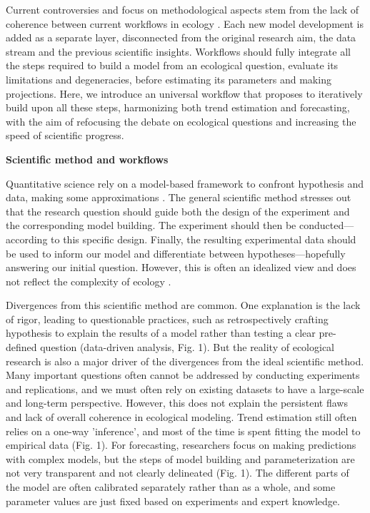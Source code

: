 \documentclass[11pt]{article}
\begin{document}
Current controversies and focus on methodological aspects stem from the lack of coherence between current workflows in ecology \citep{Loreau2022, Talis2023, Johnson2024}. Each new model development is added as a separate layer, disconnected from the original research aim, the data stream and the previous scientific insights. Workflows should fully integrate all the steps required to build a model from an ecological question, evaluate its limitations and degeneracies, before estimating its parameters and making projections. Here, we introduce an universal workflow that proposes to iteratively build upon all these steps, harmonizing both trend estimation and forecasting, with the aim of refocusing the debate on ecological questions and increasing the speed of scientific progress.

\vspace{0.5cm}
\noindent \textbf{Scientific method and workflows}

Quantitative science rely on a model-based framework to confront hypothesis and data, making some approximations \citep{}. The general scientific method stresses out that the research question should guide both the design of the experiment and the corresponding model building. The experiment should then be conducted---according to this specific design. Finally, the resulting experimental data should be used to inform our model and differentiate between hypotheses---hopefully answering our initial question. However, this is often an idealized view and does not reflect the complexity of ecology \citep{}.

Divergences from this scientific method are common. One explanation is the lack of rigor, leading to questionable practices, such as retrospectively crafting hypothesis to explain the results of a model rather than testing a clear pre-defined question (data-driven analysis, Fig. 1). But the reality of ecological research is also a major driver of the divergences from the ideal scientific method. Many important questions often cannot be addressed by conducting experiments and replications, and we must often rely on existing datasets to have a large-scale and long-term perspective. %
However, this does not explain the persistent flaws and lack of overall coherence in ecological modeling. Trend estimation still often relies on a one-way 'inference',  %
and most of the time is spent fitting the model to empirical data (Fig. 1). For forecasting, researchers focus on making predictions with complex models, but the steps of model building and parameterization are not very transparent and not clearly delineated (Fig. 1). The different parts of the model are often calibrated separately rather than as a whole, and some parameter values are just fixed based on experiments and expert knowledge.
\end{document}
